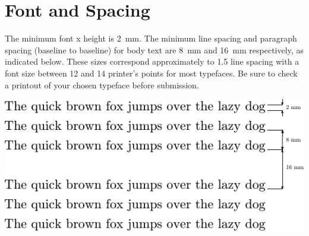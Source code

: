 \documentclass[a5paper, 10pt]{article}
\begin{document}
\section{Font and Spacing}
\label{sec:app-font-spacing}

The minimum font x height is \SI{2}{mm}.  
The minimum line spacing and paragraph spacing (baseline to baseline) for body text are \SI{8}{mm} and \SI{16}{mm} respectively, as indicated below.  
These sizes correspond approximately to 1.5 line spacing with a font
size between 12 and 14 printer's points for most typefaces.  
Be sure to check a printout of your chosen typeface before submission.

\vspace{5em}

\includegraphics[width=\textwidth,clip=true,trim=5em 0 0 0]{fontsizes}




\end{document}
